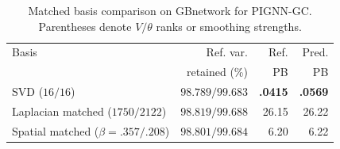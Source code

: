 \documentclass{article}
\begin{document}
\begin{table}[t]
\centering
\caption{
Matched basis comparison on GBnetwork for PIGNN-GC.
Parentheses denote $V/\theta$ ranks or smoothing strengths.
}
\label{tab:basis_control}
\setlength{\tabcolsep}{1.8pt}
\begin{tabular}{lrrr}
\toprule
Basis &
Ref. var. &
Ref. &
Pred. \\
& retained (\%) & PB & PB \\
\midrule
SVD ($16/16$)
& $98.789/99.683$
& \textbf{.0415}
& \textbf{.0569} \\

Laplacian matched ($1750/2122$)
& $98.819/99.688$
& 26.15
& 26.22 \\

Spatial matched ($\beta=.357/.208$)
& $98.801/99.684$
& 6.20
& 6.22 \\
\bottomrule
\end{tabular}
\end{table}

\end{document}
